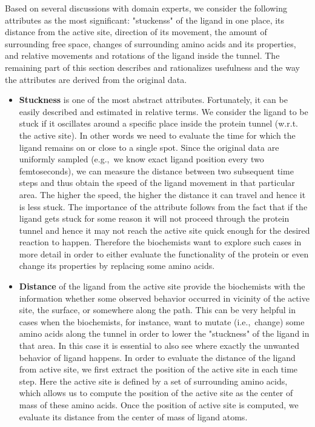 \documentclass[twocolumn]{bmcart}%
\newcommand{\ie}{i.e.,~}
\newcommand{\eg}{e.g.,~}
\begin{document}
Based on several discussions with domain experts, we consider the following attributes as the most significant: "stuckenss" of the ligand in one place, its distance from the active site, direction of its movement, the amount of surrounding free space, changes of surrounding amino acids and its properties, and relative movements and rotations of the ligand inside the tunnel. 
The remaining part of this section describes and rationalizes usefulness and the way the attributes are derived from the original data.    
\begin{itemize}

\item \textbf{Stuckness} is one of the most abstract attributes. Fortunately, it can be easily described and estimated in relative terms. 
We consider the ligand to be stuck if it oscillates around a specific place inside the protein tunnel (w.r.t. the active site).  
In other words we need to evaluate the time for which the ligand remains on or close to a single spot. 
Since the original data are uniformly sampled (\eg we know exact ligand position every two femtoseconds), we can measure the distance between two subsequent time steps and thus obtain the speed of the ligand movement in that particular area. 
The higher the speed, the higher the distance it can travel and hence it is less stuck. 
The importance of the attribute follows from the fact that if the ligand gets stuck for some reason it will not proceed through the protein tunnel and hence it may not reach the active site quick enough for the desired reaction to happen.
Therefore the biochemists want to explore such cases in more detail in order to either evaluate the functionality of the protein or even change its properties by replacing some amino acids.


\item \textbf{Distance} of the ligand from the active site provide the biochemists with the information whether some observed behavior occurred in vicinity of the active site, the surface, or somewhere along the path. 
This can be very helpful in cases when the biochemists, for instance, want to mutate (\ie change) some amino acids along the tunnel in order to lower the "stuckness" of the ligand in that area. 
In this case it is essential to also see where exactly the unwanted behavior of ligand happens.
In order to evaluate the distance of the ligand from active site, we first extract the position of the active site in each time step. 
Here the active site is defined by a set of surrounding amino acids, which allows us to compute the position of the active site as the center of mass of these amino acids. 
Once the position of active site is computed, we evaluate its distance from the center of mass of ligand atoms.
      

\end{itemize}
\end{document}
